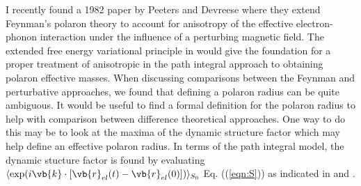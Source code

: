 I recently found a 1982 paper by Peeters and Devreese \cite{Devreese1982} where they extend Feynman's polaron theory to account for anisotropy of the effective electron-phonon interaction under the influence of a perturbing magnetic field. The extended free energy variational principle in \cite{Devreese1982} would give the foundation for a proper treatment of anisotropic in the path integral approach to obtaining polaron effective masses. When discussing comparisons between the Feynman and perturbative approaches, we found that defining a polaron radius can be quite ambiguous. It would be useful to find a formal definition for the polaron radius to help with comparison between difference theoretical approaches. One way to do this may be to look at the maxima of the dynamic structure factor which may help define an effective polaron radius. In terms of the path integral model, the dynamic stucture factor is found by evaluating $\langle \exp(i \vb{k} \cdot [\vb{r}_{el}(t) - \vb{r}_{el}(0)]) \rangle_{S_0}$ Eq. ((\ref{eqn:S})) as indicated in \cite{Devreese2001} and \cite{Devreesetwo}.